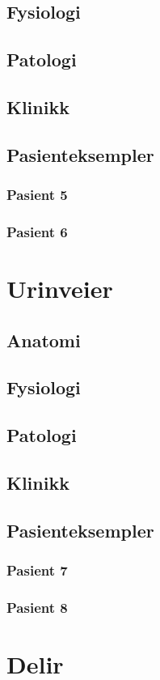 \documentclass[a4paper,12pt,twoside]{memoir}
\begin{document}
		\section{Fysiologi}
		\section{Patologi}
		\section{Klinikk}
		\section{Pasienteksempler}
			\subsection{Pasient 5}
			\subsection{Pasient 6}
	\chapter{Urinveier}
		\section{Anatomi}
		\section{Fysiologi}
		\section{Patologi}
		\section{Klinikk}
		\section{Pasienteksempler}
			\subsection{Pasient 7}
			\subsection{Pasient 8}
	\chapter{Delir}
\end{document}
